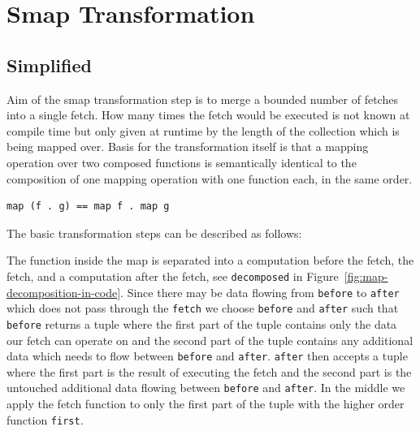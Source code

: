 \chapter{Smap Transformation}

\label{ch:smap-transformation}

\section{Simplified}

Aim of the smap transformation step is to merge a bounded number of fetches into a single fetch.
How many times the fetch would be executed is not known at compile time but only given at runtime by the length of the collection which is being mapped over.
Basis for the transformation itself is that a mapping operation over two composed functions is semantically identical to the composition of one mapping operation with one function each, in the same order.

\begin{verbatim}
map (f . g) == map f . map g
\end{verbatim}

The basic transformation steps can be described as follows:

The function inside the map is separated into a computation before the fetch, the fetch, and a computation after the fetch, see \texttt{decomposed} in Figure~\ref{fig:map-decomposition-in-code}.
Since there may be data flowing from \texttt{before} to \texttt{after} which does not pass through the \texttt{fetch} we choose \texttt{before} and \texttt{after} such that \texttt{before} returns a tuple where the first part of the tuple contains only the data our fetch can operate on and the second part of the tuple contains any additional data which needs to flow between \texttt{before} and \texttt{after}.
\texttt{after} then accepts a tuple where the first part is the result of executing the fetch and the second part is the untouched additional data flowing between \texttt{before} and \texttt{after}.
In the middle we apply the fetch function to only the first part of the tuple with the higher order function \texttt{first}.

